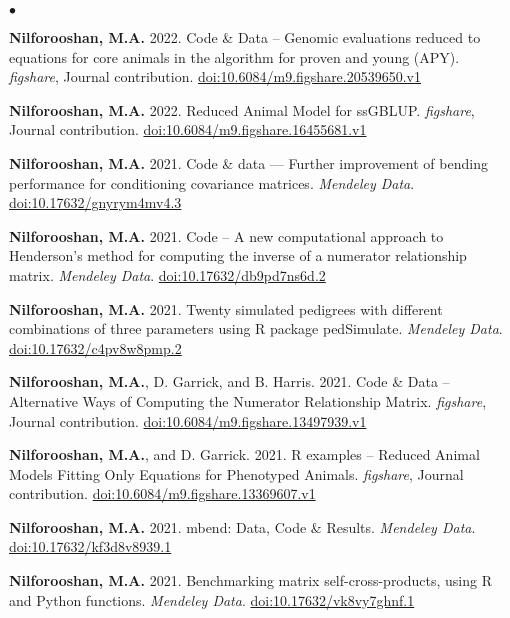 \documentclass[margin,line]{res}
\newenvironment{list2}{
  \begin{list}{$\bullet$}{%
      \setlength{\itemsep}{0in}
      \setlength{\parsep}{0in} \setlength{\parskip}{0in}
      \setlength{\topsep}{0in} \setlength{\partopsep}{0in}
      \setlength{\leftmargin}{0.2in}}}{\end{list}}
\begin{document}
\begin{resume}
\begin{list2}
\item {\bf Nilforooshan, M.A.} 2022. Code \& Data -- Genomic evaluations reduced to equations for core animals in the algorithm for proven and young (APY). {\em figshare}, Journal contribution. \href{https://doi.org/10.6084/m9.figshare.20539650.v1}{doi:10.6084/m9.figshare.20539650.v1}
\item {\bf Nilforooshan, M.A.} 2022. Reduced Animal Model for ssGBLUP. {\em figshare}, Journal contribution. \href{https://doi.org/10.6084/m9.figshare.16455681.v1}{doi:10.6084/m9.figshare.16455681.v1}
\item {\bf Nilforooshan, M.A.} 2021. Code \& data --- Further improvement of bending performance for conditioning covariance matrices. {\em Mendeley Data}. \href{https://doi.org/10.17632/gnyrym4mv4.3}{doi:10.17632/gnyrym4mv4.3}
\item {\bf Nilforooshan, M.A.} 2021. Code -- A new computational approach to Henderson’s method for computing the inverse of a numerator relationship matrix. {\em Mendeley Data}. \href{https://doi.org/10.17632/db9pd7ns6d.2}{doi:10.17632/db9pd7ns6d.2}
\item {\bf Nilforooshan, M.A.} 2021. Twenty simulated pedigrees with different combinations of three parameters using R package pedSimulate. {\em Mendeley Data}. \href{https://doi.org/10.17632/c4pv8w8pmp.2}{doi:10.17632/c4pv8w8pmp.2}
\item {\bf Nilforooshan, M.A.}, D. Garrick, and B. Harris. 2021. Code \& Data -- Alternative Ways of Computing the Numerator Relationship Matrix. {\em figshare}, Journal contribution. \href{https://doi.org/10.6084/m9.figshare.13497939.v1}{doi:10.6084/m9.figshare.13497939.v1}
\item {\bf Nilforooshan, M.A.}, and D. Garrick. 2021. R examples -- Reduced Animal Models Fitting Only Equations for Phenotyped Animals. {\em figshare}, Journal contribution. \href{https://doi.org/10.6084/m9.figshare.13369607.v1}{doi:10.6084/m9.figshare.13369607.v1}
\item {\bf Nilforooshan, M.A.} 2021. mbend: Data, Code \& Results. {\em Mendeley Data}. \href{https://doi.org/10.17632/kf3d8v8939.1}{doi:10.17632/kf3d8v8939.1}
\item {\bf Nilforooshan, M.A.} 2021. Benchmarking matrix self-cross-products, using R and Python functions. {\em Mendeley Data}. \href{https://doi.org/10.17632/vk8vy7ghnf.1}{doi:10.17632/vk8vy7ghnf.1}
\end{list2}

\end{resume}
\end{document}
